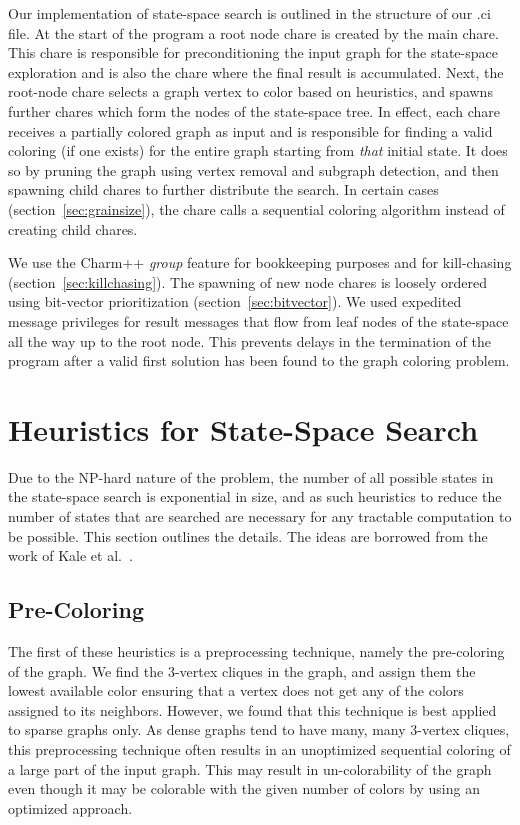 \documentclass[10pt,oneside]{article}
\begin{document}
Our implementation of state-space search is outlined in the structure of our
  .ci file. At the start of the program a root node chare is created by the main
  chare. This chare is responsible for preconditioning the input graph for the state-space 
  exploration and is also the chare where the final result is accumulated. Next, the root-node 
  chare selects a graph vertex to color based on heuristics, and spawns further chares which
  form the nodes of the state-space tree. In effect, each chare receives a partially colored graph
  as input and is responsible for finding a valid coloring (if one exists) for the entire graph starting 
  from \emph{that} initial state. It does so by pruning the graph using vertex removal and subgraph 
  detection, and then spawning child chares to further distribute the search. In certain cases 
  (section~\ref{sec:grainsize}), the chare calls a sequential coloring algorithm instead of creating child 
  chares.
  
  We use the Charm++ \emph{group} feature for bookkeeping purposes and for 
  kill-chasing (section~\ref{sec:killchasing}). The spawning of new node chares is loosely ordered 
  using bit-vector prioritization (section~\ref{sec:bitvector}). We used expedited message privileges for
  result messages that flow from leaf nodes of the state-space all the way up to the root node. This prevents
  delays in the termination of the program after a valid first solution has been found to the graph coloring
  problem.
  
\section{Heuristics for State-Space Search}
Due to the NP-hard nature of the problem, the number of all possible states in
  the state-space search is exponential in size, and as such heuristics to
  reduce the number of states that are searched are necessary for any tractable
  computation to be possible. This section outlines the details. The ideas are borrowed 
  from the work of Kale et al.~\cite{Kale1995}.

\subsection{Pre-Coloring}
  The first of these heuristics is a preprocessing technique, namely the
  pre-coloring of the graph. We find the 3-vertex cliques in the graph, and assign
  them the lowest available color ensuring that a vertex does not get any of the colors 
  assigned to its neighbors. However, we found that this technique is best applied to 
  sparse graphs only. As dense graphs tend to have many, many 3-vertex cliques, this preprocessing
  technique often results in an unoptimized sequential coloring of a large part of the input graph.
  This may result in un-colorability of the graph even though it may be colorable with the given number
  of colors by using an optimized approach. 
\end{document}
